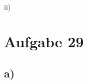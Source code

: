 \documentclass[a4paper,12pt]{scrartcl}
\begin{document}
ii)
\begin{center}
\end{center}

\section{Aufgabe 29} 
\subsection{a)}
\end{document}
